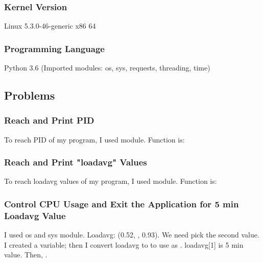\documentclass[]{article}
\begin{document}
\subsubsection*{Kernel Version}
Linux 5.3.0-46-generic x86 64
\subsubsection*{Programming Language}
Python 3.6 (Imported modules: os, sys, requests, threading, time)

\subsection{Problems}
\subsubsection{Reach and Print PID}
To reach PID of my program, I used  module. Function is: 
\subsubsection{Reach and Print "loadavg" Values}
To reach loadavg values of my program, I used  module. Function is: 
\subsubsection{Control CPU Usage and Exit the Application for 5 min Loadavg Value}
I used \boldsymbol os and \boldsymbol sys module. Loadavg: (0.52, , 0.93). We need pick the second value. I created a variable;  then I convert loadavg to  to use as . loadavg[1] is 5 min value.\newline
Then, . 
\end{document}

